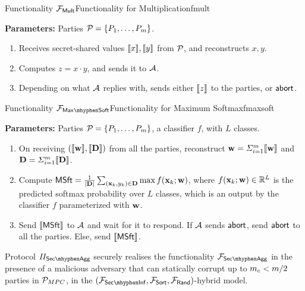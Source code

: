 \begin{protofig}{Functionality $\mathcal{F}_{\mathsf{Mult}}$}{Functionality for Multiplication}{fmult}

\textbf{Parameters:} Parties $\mathcal{P}_{} = \{P_1, \ldots, P_m\}$.

\begin{enumerate}
    \item Receives secret-shared values $\llbracket x\rrbracket, \llbracket y\rrbracket$ from $\mathcal{P}_{}$, and reconstructs $x, y$.
    \item Computes $z = x \cdot y$, and sends it to $\mathcal{A}$.
    \item Depending on what $\mathcal{A}$ replies with, sends either $\llbracket z\rrbracket$ to the parties, or $\mathsf{abort}$.
\end{enumerate}

    
\end{protofig}



\begin{protofig}{Functionality $\FMaxSoft$}{Functionality for Maximum Softmax}{fmaxsoft}

\textbf{Parameters:} Parties $\mathcal{P}_{} = \{P_1, \ldots, P_m\}$, a classifier $f$, with $L$ classes.

\begin{enumerate}
    \item On receiving $(\llbracket {\ensuremath{\mathbf{w}}}\rrbracket, \llbracket {\ensuremath{\mathbf{D}}}\rrbracket)$ from all the parties, reconstruct ${\mathbf{w}} = \Sigma_{i = 1}^m \llbracket {\ensuremath{\mathbf{w}}}\rrbracket$ and ${\mathbf{D}} = \Sigma_{i = 1}^m \llbracket {\ensuremath{\mathbf{D}}}\rrbracket$.
    \item Compute $\mathsf{MSft} = \frac{1}{|\mathbf{D}|} \sum_{(\mathbf{x}_k, y_k) \in \mathbf{D}} \max f(\mathbf{x}_k; \mathbf{w})$, where $f(\mathbf{x}_k; \mathbf{w}) \in \mathbb{R}^L$ is the predicted softmax probability over $L$ classes, which is an output by the classifier $f$ parameterized with $\mathbf{w}$. 
    \item Send $\llbracket \mathsf{MSft}\rrbracket$ to $\mathcal{A}$ and wait for it to respond. If $\mathcal{A}$ sends $\mathsf{abort}$, send $\mathsf{abort}$ to all the parties. Else, send $\llbracket \mathsf{MSft}\rrbracket$.
\end{enumerate} 
    
\end{protofig}

\begin{theorem}\label{thm:secagg}
    Protocol $\PSecAgg$ securely realises the functionality $\FSecAgg$ in the presence of a malicious adversary that can statically corrupt up to $m_c < m/2$ parties in $\mathcal{P}_{MPC}$, in the $(\FSecInf, \FSort, \FRand)$-hybrid model.
\end{theorem}

